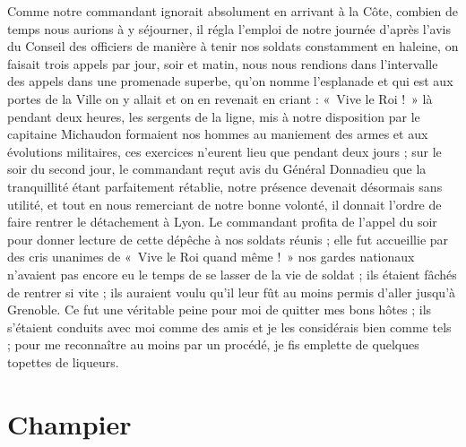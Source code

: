 \documentclass[11pt,a4paper]{report}
\begin{document}
Comme notre commandant ignorait absolument en arrivant à la Côte, combien de temps nous aurions à y séjourner, il régla l'emploi de notre journée d'après l'avis du Conseil des officiers de manière à tenir nos soldats constamment en haleine, on faisait trois appels par jour, soir et matin, nous nous rendions dans l'intervalle des appels dans une promenade superbe, qu'on nomme l'esplanade et qui est aux portes de la Ville on y allait et on en revenait en criant : «~Vive le Roi !~» là pendant deux heures, les sergents de la ligne, mis à notre disposition par le capitaine Michaudon formaient nos hommes au maniement des armes et aux évolutions militaires, ces exercices n'eurent lieu que pendant deux jours ; sur le soir du second jour, le commandant reçut avis du Général Donnadieu que la tranquillité étant parfaitement rétablie, notre présence devenait désormais sans utilité, et tout en nous remerciant de notre bonne volonté, il donnait l'ordre de faire rentrer le détachement à Lyon. Le commandant profita de l'appel du soir pour donner lecture de cette dépêche à nos soldats réunis ; elle fut accueillie par des cris unanimes de «~Vive le Roi quand même !~» nos gardes nationaux n'avaient pas encore eu le temps de se lasser de la vie de soldat ; ils étaient fâchés de rentrer si vite ; ils auraient voulu qu'il leur fût au moins permis d'aller jusqu'à Grenoble. Ce fut une véritable peine pour moi de quitter mes bons hôtes ; ils s'étaient conduits avec moi comme des amis et je les considérais bien comme tels ; pour me reconnaître au moins par un procédé, je fis emplette de quelques topettes de liqueurs.

\section*{Champier}
\end{document}
